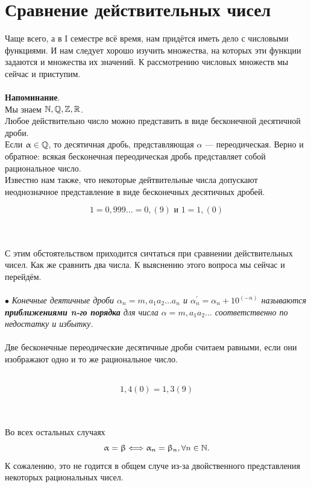 \section{Сравнение действительных чисел}
Чаще всего, а в I семестре всё время, нам придётся иметь дело с числовыми функциями. И нам следует хорошо изучить множества, на которых эти функции задаются и множества их значений. К рассмотрению числовых множеств мы сейчас и приступим.\\\\
\textbf{Напоминание}.\\
Мы знаем $\mathbb{N}, \mathbb{Q}, \mathbb{Z}, \mathbb{R}$.\\
Любое действительно число можно представить в виде бесконечной десятичной дроби.\\
Если $\upalpha \in \mathbb{Q}$, то десятичная дробь, представляющая $\alpha$ --- переодическая. Верно и обратное: всякая бесконечная переодическая дробь представляет собой рациональное число.\\
Известно нам также, что некоторые дейтвительные числа допускают неоднозначное представление в виде бесконечных десятичных дробей.\\
\begin{example} 
	\[1 = 0,999...= 0,(9)\text{ и }1 = 1,(0)\]
\end{example}\\\\ 
С этим обстоятельством приходится сичтаться при сравнении действительных чисел. Как же сравнить два числа. К выяснению этого вопроса мы сейчас и перейдём.\\\\
$\bullet$ \textit{Конечные деятичные дроби $\alpha_n = m,a_1a_2 \dots a_n$ и $\alpha_n^\prime = \alpha_n + {10}^{(-n)}$ называются \textbf{приближениями n-го порядка} для числа $\alpha = m,a_1a_2 \dots$ соответственно по недостатку и избытку.}\\\\
Две бесконечные переодические десятичные дроби считаем равными, если они изображают одно и то же рациональное число.\\\\
\begin{example} 
	\[1,4(0)=1,3(9)\]
\end{example}\\\\
Во всех остальных случаях $$\upalpha=\upbeta \Longleftrightarrow  \upalpha_n=\upbeta_n, \forall n  \in \mathbb{N}.$$
К сожалению, это не годится в общем случе из-за двойственного представления некоторых рациональных чисел.\\\\
